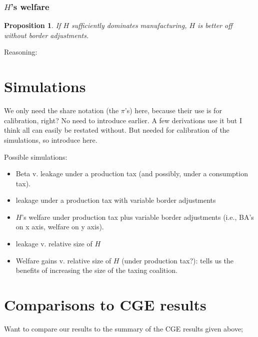 \documentclass[notitlepage,12pt]{article}
\newtheorem{proposition}[theorem]{Proposition}
\begin{document}
\subsubsection{$H$'s welfare}

\begin{proposition}
If $H$ sufficiently dominates manufacturing, $H$ is better off without
border adjustments.
\end{proposition}

Reasoning:

\section{Simulations}

We only need the share notation (the $\pi $'s) here, because their use is
for calibration, right? No need to introduce earlier. A few derivations use
it but I think all can easily be restated without. But needed for
calibration of the simulations, so introduce here.

Possible simulations:

\begin{itemize}
\item Beta v. leakage under a production tax (and possibly, under a
consumption tax).

\item leakage under a production tax with variable border adjustments

\item $H$'s welfare under production tax plus variable border adjustments
(i.e., BA's on x axis, welfare on y axis).

\item leakage v. relative size of $H$

\item Welfare gains v. relative size of $H$ (under production tax?): tells
us the benefits of increasing the size of the taxing coalition.
\end{itemize}

\section{Comparisons to CGE results}

Want to compare our results to the summary of the CGE results given above;
\end{document}
